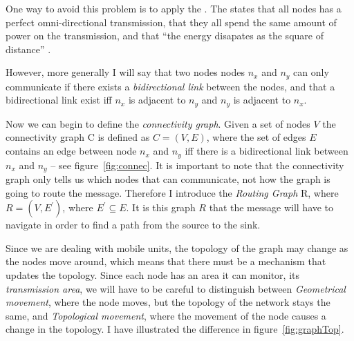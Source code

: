 One way to avoid this problem is to apply the \uga. The \uga states that all nodes has a perfect omni-directional transmission, that they all spend the same amount of power on the transmission, and that ``the energy disapates as the square of distance'' \cite{practical}.

However, more generally I will say that two nodes nodes $n_x$ and $n_y$ can only communicate if there exists a \emph{bidirectional link} between the nodes, and that a bidirectional link exist iff $n_x$ is adjacent to $n_y$ and $n_y$ is adjacent to $n_x$.


Now we can begin to define the \emph{connectivity graph}. Given a set of nodes $V$ the connectivity graph C is defined as $C = (V, E)$, where the set of edges $E$ contains an edge between node $n_x$ and $n_y$ iff there is a bidirectional link between $n_x$ and $n_y$ -- see figure~\ref{fig:connec}. It is important to note that the connectivity graph only tells us which nodes that can communicate, not how the graph is going to route the message. Therefore I introduce the \emph{Routing Graph} R, where $R = (V, E^{\prime})$, where $E^{\prime} \subseteq E$. It is this graph $R$ that the message will have to navigate in order to find a path from the source to the sink.


Since we are dealing with mobile units, the topology of the graph may change as the nodes move around, which means that there must be a mechanism that updates the topology. Since each node has an area it can monitor, its \emph{transmission area}, we will have to be careful to distinguish between \emph{Geometrical movement}, where the node moves, but the topology of the network stays the same, and \emph{Topological movement}, where the movement of the node causes a change in the topology. I have illustrated the difference in figure~\ref{fig:graphTop}. 

